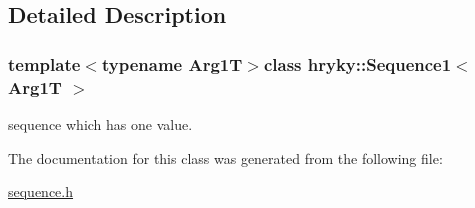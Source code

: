 \subsection{Detailed Description}
\subsubsection*{template$<$typename Arg1\-T$>$class hryky\-::\-Sequence1$<$ Arg1\-T $>$}

sequence which has one value. 

The documentation for this class was generated from the following file\-:\begin{DoxyCompactItemize}
\item 
\hyperlink{sequence_8h}{sequence.\-h}\end{DoxyCompactItemize}
